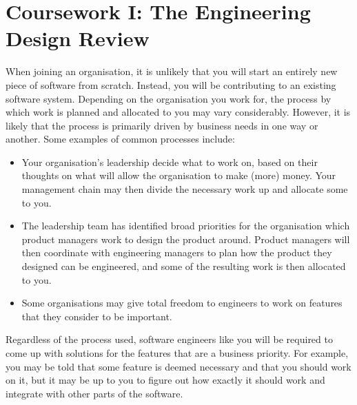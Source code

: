 
\pagebreak
\section{Coursework I: The Engineering Design Review}

When joining an organisation, it is unlikely that you will start an entirely new piece of software from scratch. Instead, you will be contributing to an existing software system. Depending on the organisation you work for, the process by which work is planned and allocated to you may vary considerably. However, it is likely that the process is primarily driven by business needs in one way or another. Some examples of common processes include:

\begin{itemize}
    \item Your organisation's leadership decide what to work on, based on their thoughts on what will allow the organisation to make (more) money. Your management chain may then divide the necessary work up and allocate some to you.
    \item The leadership team has identified broad priorities for the organisation which product managers work to design the product around. Product managers will then coordinate with engineering managers to plan how the product they designed can be engineered, and some of the resulting work is then allocated to you.
    \item Some organisations may give total freedom to engineers to work on features that they consider to be important.
\end{itemize}

Regardless of the process used, software engineers like you will be required to come up with solutions for the features that are a business priority. For example, you may be told that some feature is deemed necessary and that you should work on it, but it may be up to you to figure out how exactly it should work and integrate with other parts of the software.

